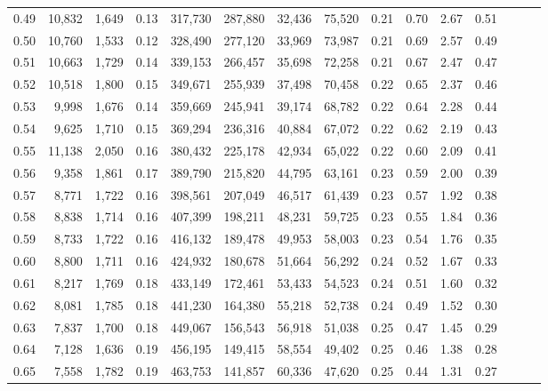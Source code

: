 \begin{tabular}{rrrrrrrrrrrrrrr}
0.49 &  10,832 &  1,649 &  0.13 &  317,730 &  287,880 &   32,436 &   75,520 &  0.21 &  0.70 &  2.67 &      0.51 \\
0.50 &  10,760 &  1,533 &  0.12 &  328,490 &  277,120 &   33,969 &   73,987 &  0.21 &  0.69 &  2.57 &      0.49 \\
0.51 &  10,663 &  1,729 &  0.14 &  339,153 &  266,457 &   35,698 &   72,258 &  0.21 &  0.67 &  2.47 &      0.47 \\
0.52 &  10,518 &  1,800 &  0.15 &  349,671 &  255,939 &   37,498 &   70,458 &  0.22 &  0.65 &  2.37 &      0.46 \\
0.53 &   9,998 &  1,676 &  0.14 &  359,669 &  245,941 &   39,174 &   68,782 &  0.22 &  0.64 &  2.28 &      0.44 \\
0.54 &   9,625 &  1,710 &  0.15 &  369,294 &  236,316 &   40,884 &   67,072 &  0.22 &  0.62 &  2.19 &      0.43 \\
0.55 &  11,138 &  2,050 &  0.16 &  380,432 &  225,178 &   42,934 &   65,022 &  0.22 &  0.60 &  2.09 &      0.41 \\
0.56 &   9,358 &  1,861 &  0.17 &  389,790 &  215,820 &   44,795 &   63,161 &  0.23 &  0.59 &  2.00 &      0.39 \\
0.57 &   8,771 &  1,722 &  0.16 &  398,561 &  207,049 &   46,517 &   61,439 &  0.23 &  0.57 &  1.92 &      0.38 \\
0.58 &   8,838 &  1,714 &  0.16 &  407,399 &  198,211 &   48,231 &   59,725 &  0.23 &  0.55 &  1.84 &      0.36 \\
0.59 &   8,733 &  1,722 &  0.16 &  416,132 &  189,478 &   49,953 &   58,003 &  0.23 &  0.54 &  1.76 &      0.35 \\
0.60 &   8,800 &  1,711 &  0.16 &  424,932 &  180,678 &   51,664 &   56,292 &  0.24 &  0.52 &  1.67 &      0.33 \\
0.61 &   8,217 &  1,769 &  0.18 &  433,149 &  172,461 &   53,433 &   54,523 &  0.24 &  0.51 &  1.60 &      0.32 \\
0.62 &   8,081 &  1,785 &  0.18 &  441,230 &  164,380 &   55,218 &   52,738 &  0.24 &  0.49 &  1.52 &      0.30 \\
0.63 &   7,837 &  1,700 &  0.18 &  449,067 &  156,543 &   56,918 &   51,038 &  0.25 &  0.47 &  1.45 &      0.29 \\
0.64 &   7,128 &  1,636 &  0.19 &  456,195 &  149,415 &   58,554 &   49,402 &  0.25 &  0.46 &  1.38 &      0.28 \\
0.65 &   7,558 &  1,782 &  0.19 &  463,753 &  141,857 &   60,336 &   47,620 &  0.25 &  0.44 &  1.31 &      0.27 \\

\end{tabular}
